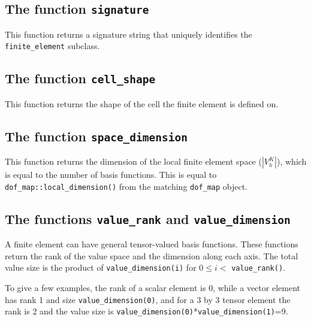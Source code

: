 \subsection{The function \texttt{signature}}
This function returns a signature string that uniquely identifies the \texttt{finite\_element} subclass.


\subsection{The function \texttt{cell\_shape}}
This function returns the shape of the cell the finite element is defined on.


\subsection{The function \texttt{space\_dimension}}
This function returns the dimension of the local finite element space ($| V_h^K |$),
which is equal to the number of basis functions. This is equal to \texttt{dof\_map::local\_dimension()}
from the matching \texttt{dof\_map} object.



\subsection{The functions \texttt{value\_rank} and \texttt{value\_dimension}}
A finite element can have general tensor-valued basis functions.
These functions return the rank of the value space and the dimension along each axis.
The total value size is the product of \texttt{value\_dimension(i)} for $0 \le i <$ \texttt{value\_rank()}.

To give a few examples, the rank of a scalar element is 0, while a vector element has rank 1 and size \texttt{value\_dimension(0)}, 
and for a 3 by 3 tensor element the rank is 2 and the value size is \texttt{value\_dimension(0)}*\texttt{value\_dimension(1)}=9.

